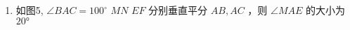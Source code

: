 \begin{enumerate}
\def\labelenumi{\arabic{enumi}.}
\setcounter{enumi}{12}
\tightlist
\item
  如图5, \(\angle B A C = 10 0 ^ { \circ }\) \(M N\) \(E F\)
  分别垂直平分 \(A B , A C\) ，则 \(\angle M A E\) 的大小为\(20°\)
\end{enumerate}
